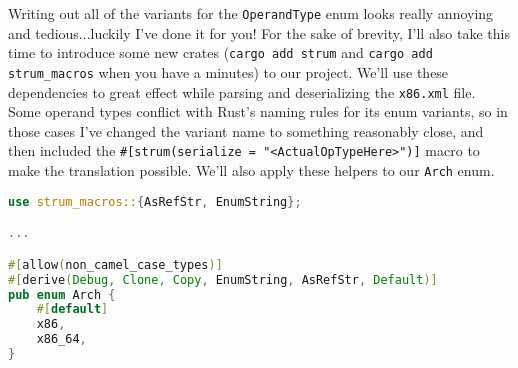 Writing out all of the variants for the \texttt{OperandType} enum looks really annoying and tedious...luckily I've done it for you! For the sake of brevity, I'll also take this time to introduce some new crates (\texttt{cargo add strum} and \texttt{cargo add strum\_macros} when you have a minutes) to our project. We'll use these dependencies to great effect while parsing and deserializing the \texttt{x86.xml} file. Some operand types conflict with Rust's naming rules for its enum variants, so in those cases I've changed the variant name to something reasonably close, and then included the \texttt{\#[strum(serialize = "<ActualOpTypeHere>")]} macro to make the translation possible. We'll also apply these helpers to our \texttt{Arch} enum.

\begin{lstlisting}[language=rust]
use strum_macros::{AsRefStr, EnumString};

...

#[allow(non_camel_case_types)]
#[derive(Debug, Clone, Copy, EnumString, AsRefStr, Default)]
pub enum Arch {
    #[default]
    x86,
    x86_64,
}


\end{lstlisting}
